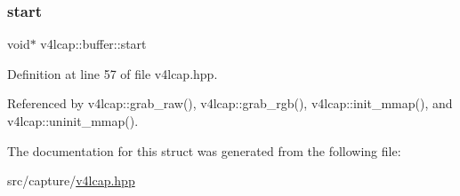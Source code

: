 \subsubsection{\texorpdfstring{start}{start}}
{\footnotesize\ttfamily void$\ast$ v4lcap\+::buffer\+::start}



Definition at line 57 of file v4lcap.\+hpp.



Referenced by v4lcap\+::grab\+\_\+raw(), v4lcap\+::grab\+\_\+rgb(), v4lcap\+::init\+\_\+mmap(), and v4lcap\+::uninit\+\_\+mmap().



The documentation for this struct was generated from the following file\+:\begin{DoxyCompactItemize}
\item 
src/capture/\hyperlink{v4lcap_8hpp}{v4lcap.\+hpp}\end{DoxyCompactItemize}
